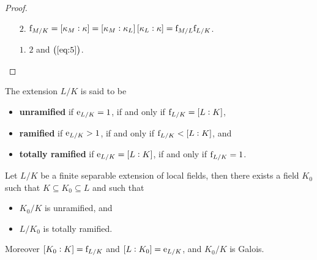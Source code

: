 \begin{proof}
\hfill
\begin{itemize}
\item[$ 2 $.] $ \f_{M / K} = \sbr{\kappa_M : \kappa} = \sbr{\kappa_M : \kappa_L}\sbr{\kappa_L : \kappa} = \f_{M / L}\f_{L / K} $.
\item[$ 1 $.] $ 2 $ and $ \br{\ref{eq:5}} $.
\end{itemize}
\end{proof}

\begin{definition}
The extension $ L / K $ is said to be
\begin{itemize}
\item \textbf{unramified} if $ \mathrm{e}_{L / K} = 1 $, if and only if $ \f_{L / K} = \sbr{L : K} $,
\item \textbf{ramified} if $ \mathrm{e}_{L / K} > 1 $, if and only if $ \f_{L / K} < \sbr{L : K} $, and
\item \textbf{totally ramified} if $ \e_{L / K} = \sbr{L : K} $, if and only if $ \mathrm{f}_{L / K} = 1 $.
\end{itemize}
\end{definition}

\begin{theorem}
\label{thm:14.3}
Let $ L / K $ be a finite separable extension of local fields, then there exists a field $ K_0 $ such that $ K \subseteq K_0 \subseteq L $ and such that
\begin{itemize}
\item $ K_0 / K $ is unramified, and
\item $ L / K_0 $ is totally ramified.
\end{itemize}
Moreover $ \sbr{K_0 : K} = \f_{L / K} $ and $ \sbr{L : K_0} = \e_{L / K} $, and $ K_0 / K $ is Galois.
\end{theorem}

